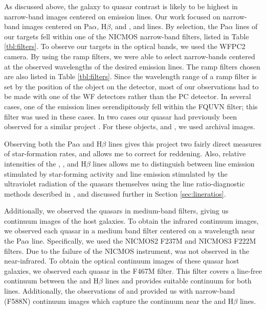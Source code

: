 As discussed above, the galaxy to quasar contrast is likely to be highest in narrow-band images centered on emission lines. Our work focused on narrow-band images centered on Pa$\alpha$, H$\beta$, and , and  lines. By selection, the Pa$\alpha$ lines of our targets fell within one of the NICMOS narrow-band filters, listed in Table \ref{tbl:filters}. To observe our targets in the optical bands, we used the WFPC2 camera. By using the ramp filters, we were able to select narrow-bands centered at the observed wavelengths of the desired emission lines. The ramp filters chosen are also listed in Table \ref{tbl:filters}. Since the wavelength range of a ramp filter is set by the position of the object on the detector, most of our observations had to be made with one of the WF detectors rather than the PC detector. In several cases, one of the emission lines serendipitously fell within the FQUVN filter; this filter was used in these cases. In two cases our quasar had previously been observed for a similar project \citep{Bennert}. For these objects,  and , we used archival  images. %

Observing both the Pa$\alpha$ and H$\beta$ lines gives this project two fairly direct measures of star-formation rates, and allows me to correct for reddening. Also, relative intensities of the , , and H$\beta$ lines allows me to distinguish between line emission stimulated by star-forming activity and line emission stimulated by the ultraviolet radiation of the quasars themselves using the line ratio-diagnostic methods described in \cite{BPT}, and discussed further in Section \ref{sec:lineratios}.

Additionally, we observed the quasars in medium-band filters, giving us continuum images of the host galaxies. To obtain the infrared continuum images, we observed each quasar in a medium band filter centered on a wavelength near the Pa$\alpha$ line. Specifically, we used the NICMOS2 F237M and NICMOS3 F222M filters. Due to the failure of the NICMOS instrument,  was not observed in the near-infrared. To obtain the optical continuum images of these quasar host galaxies, we observed each quasar in the F467M filter. This filter covers a line-free continuum between the  and H$\beta$ lines and provides suitable continuum for both lines. Additionally, the \cite{Bennert} observations of  and  provided us with narrow-band (F588N) continuum images which capture the continuum near the  and H$\beta$ lines.

